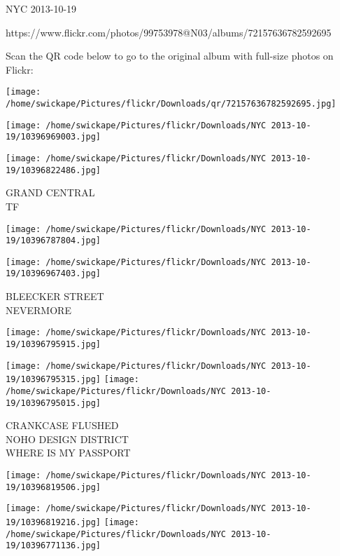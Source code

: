 \documentclass[10pt,letterpaper]{article}
\begin{document}
NYC 2013-10-19

https://www.flickr.com/photos/99753978@N03/albums/72157636782592695

Scan the QR code below to go to the original album with full-size photos on Flickr:

\texttt{[image: /home/swickape/Pictures/flickr/Downloads/qr/72157636782592695.jpg]}
\pagebreak

\texttt{[image: /home/swickape/Pictures/flickr/Downloads/NYC 2013-10-19/10396969003.jpg]}

\vspace{0.25in}
\texttt{[image: /home/swickape/Pictures/flickr/Downloads/NYC 2013-10-19/10396822486.jpg]}

GRAND CENTRAL\\
TF\\
\pagebreak

\texttt{[image: /home/swickape/Pictures/flickr/Downloads/NYC 2013-10-19/10396787804.jpg]}

\vspace{0.25in}
\texttt{[image: /home/swickape/Pictures/flickr/Downloads/NYC 2013-10-19/10396967403.jpg]}

BLEECKER STREET\\
NEVERMORE\\
\pagebreak

\texttt{[image: /home/swickape/Pictures/flickr/Downloads/NYC 2013-10-19/10396795915.jpg]}

\vspace{0.25in}
\texttt{[image: /home/swickape/Pictures/flickr/Downloads/NYC 2013-10-19/10396795315.jpg]}
\texttt{[image: /home/swickape/Pictures/flickr/Downloads/NYC 2013-10-19/10396795015.jpg]}

CRANKCASE FLUSHED\\
NOHO DESIGN DISTRICT\\
WHERE IS MY PASSPORT\\
\pagebreak

\texttt{[image: /home/swickape/Pictures/flickr/Downloads/NYC 2013-10-19/10396819506.jpg]}

\vspace{0.25in}
\texttt{[image: /home/swickape/Pictures/flickr/Downloads/NYC 2013-10-19/10396819216.jpg]}
\texttt{[image: /home/swickape/Pictures/flickr/Downloads/NYC 2013-10-19/10396771136.jpg]}
\end{document}
